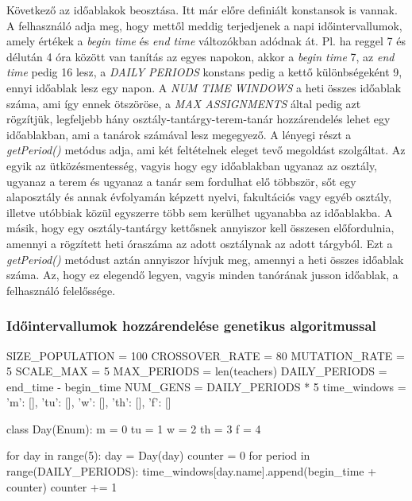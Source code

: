 \documentclass[12pt,a4paper]{report}
\begin{document}
Következő az időablakok beosztása. Itt már előre definiált konstansok is vannak. A felhasználó adja meg, hogy mettől meddig terjedjenek a napi időintervallumok, amely értékek a \textsl{begin time} és \textsl{end time} változókban adódnak át. Pl. ha reggel 7 és délután 4 óra között van tanítás az egyes napokon, akkor a \textsl{begin time} 7, az \textsl{end time} pedig 16 lesz, a \textsl{DAILY PERIODS} konstans pedig a kettő különbségeként 9, ennyi időablak lesz egy napon. A \textsl{NUM TIME WINDOWS} a heti összes időablak száma, ami így ennek ötszöröse, a \textsl{MAX ASSIGNMENTS} által pedig azt rögzítjük, legfeljebb hány osztály-tantárgy-terem-tanár hozzárendelés lehet egy időablakban, ami a tanárok számával lesz megegyező. A lényegi részt a \textsl{getPeriod()} metódus adja, ami két feltételnek eleget tevő megoldást szolgáltat. Az egyik az ütközésmentesség, vagyis hogy egy időablakban ugyanaz az osztály, ugyanaz a terem és ugyanaz a tanár sem fordulhat elő többször, sőt egy alaposztály és annak évfolyamán képzett nyelvi, fakultációs vagy egyéb osztály, illetve utóbbiak közül egyszerre több sem kerülhet ugyanabba az időablakba. A másik, hogy egy osztály-tantárgy kettősnek annyiszor kell összesen előfordulnia, amennyi a rögzített heti óraszáma az adott osztálynak az adott tárgyból. Ezt a \textsl{getPeriod()} metódust aztán annyiszor hívjuk meg, amennyi a heti összes időablak száma. Az, hogy ez elegendő legyen, vagyis minden tanórának jusson időablak, a felhasználó felelőssége.

\subsubsection{Időintervallumok hozzárendelése genetikus algoritmussal}

\begin{python}
SIZE_POPULATION = 100
CROSSOVER_RATE = 80
MUTATION_RATE = 5
SCALE_MAX = 5
MAX_PERIODS = len(teachers)
DAILY_PERIODS = end_time - begin_time
NUM_GENS = DAILY_PERIODS * 5
time_windows = {'m': [], 'tu': [], 'w': [], 'th': [], 'f': []}


class Day(Enum):
    m = 0
    tu = 1
    w = 2
    th = 3
    f = 4


for day in range(5):
    day = Day(day)
    counter = 0
    for period in range(DAILY_PERIODS):
        time_windows[day.name].append(begin_time + counter)
        counter += 1
\end{python}
\end{document}

